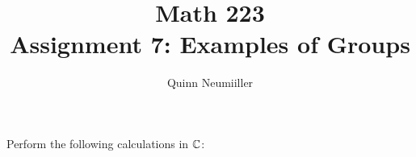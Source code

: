 \newenvironment{theorem}[2][Theorem]{\begin{trivlist}
\item[\hskip \labelsep {\bfseries #1}\hskip \labelsep {\bfseries #2.}]}{\end{trivlist}}
\newenvironment{lemma}[2][Lemma]{\begin{trivlist}
\item[\hskip \labelsep {\bfseries #1}\hskip \labelsep {\bfseries #2.}]}{\end{trivlist}}
\newenvironment{exercise}[2][Exercise]{\begin{trivlist}
\item[\hskip \labelsep {\bfseries #1}\hskip \labelsep {\bfseries #2.}]}{\end{trivlist}}
\newenvironment{problem}[2][Problem]{\begin{trivlist}
\item[\hskip \labelsep {\bfseries #1}\hskip \labelsep {\bfseries #2.}]}{\end{trivlist}}
\newenvironment{question}[2][Question]{\begin{trivlist}
\item[\hskip \labelsep {\bfseries #1}\hskip \labelsep {\bfseries #2.}]}{\end{trivlist}}
\newenvironment{corollary}[2][Corollary]{\begin{trivlist}
\item[\hskip \labelsep {\bfseries #1}\hskip \labelsep {\bfseries #2.}]}{\end{trivlist}}
 


 
\title{Math 223 \\
Assignment 7: Examples of Groups
}
\author{Quinn Neumiiller}
 
\maketitle


\begin{question}{Q1}
Perform the following calculations in $\mathbb{C}$:
\end{question}

